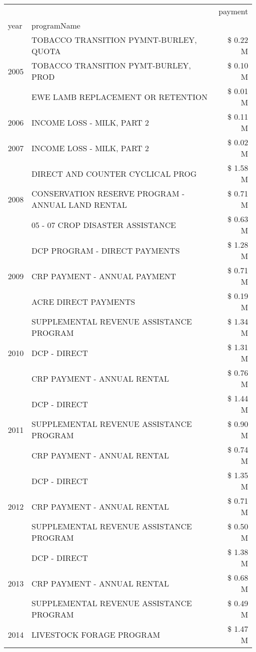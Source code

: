 \begin{tabular}{llr}
\toprule
 &  & payment \\
year & programName &  \\
\midrule
\multirow[t]{3}{*}{2005} & TOBACCO TRANSITION PYMNT-BURLEY, QUOTA & \$ 0.22 M \\
 & TOBACCO TRANSITION PYMT-BURLEY, PROD & \$ 0.10 M \\
 & EWE LAMB REPLACEMENT OR RETENTION & \$ 0.01 M \\
\cline{1-3}
2006 & INCOME LOSS - MILK, PART 2 & \$ 0.11 M \\
\cline{1-3}
2007 & INCOME LOSS - MILK, PART 2 & \$ 0.02 M \\
\cline{1-3}
\multirow[t]{3}{*}{2008} & DIRECT AND COUNTER CYCLICAL PROG & \$ 1.58 M \\
 & CONSERVATION RESERVE PROGRAM - ANNUAL LAND RENTAL & \$ 0.71 M \\
 & 05 - 07 CROP DISASTER ASSISTANCE & \$ 0.63 M \\
\cline{1-3}
\multirow[t]{3}{*}{2009} & DCP PROGRAM - DIRECT PAYMENTS & \$ 1.28 M \\
 & CRP PAYMENT - ANNUAL PAYMENT & \$ 0.71 M \\
 & ACRE DIRECT PAYMENTS & \$ 0.19 M \\
\cline{1-3}
\multirow[t]{3}{*}{2010} & SUPPLEMENTAL REVENUE ASSISTANCE PROGRAM & \$ 1.34 M \\
 & DCP - DIRECT & \$ 1.31 M \\
 & CRP PAYMENT - ANNUAL RENTAL & \$ 0.76 M \\
\cline{1-3}
\multirow[t]{3}{*}{2011} & DCP - DIRECT & \$ 1.44 M \\
 & SUPPLEMENTAL REVENUE ASSISTANCE PROGRAM & \$ 0.90 M \\
 & CRP PAYMENT - ANNUAL RENTAL & \$ 0.74 M \\
\cline{1-3}
\multirow[t]{3}{*}{2012} & DCP - DIRECT & \$ 1.35 M \\
 & CRP PAYMENT - ANNUAL RENTAL & \$ 0.71 M \\
 & SUPPLEMENTAL REVENUE ASSISTANCE PROGRAM & \$ 0.50 M \\
\cline{1-3}
\multirow[t]{3}{*}{2013} & DCP - DIRECT & \$ 1.38 M \\
 & CRP PAYMENT - ANNUAL RENTAL & \$ 0.68 M \\
 & SUPPLEMENTAL REVENUE ASSISTANCE PROGRAM & \$ 0.49 M \\
\cline{1-3}
\multirow[t]{3}{*}{2014} & LIVESTOCK FORAGE PROGRAM & \$ 1.47 M \\

\end{tabular}
